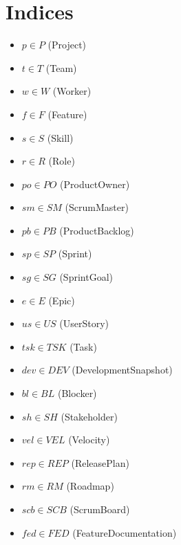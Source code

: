 \documentclass{article}
\begin{document}
\section{Indices}
\begin{itemize}
    \item $p \in P$ (Project)
    \item $t \in T$ (Team)
    \item $w \in W$ (Worker)
    \item $f \in F$ (Feature)
    \item $s \in S$ (Skill)
    \item $r \in R$ (Role)
    \item $po \in PO$ (ProductOwner)
    \item $sm \in SM$ (ScrumMaster)
    \item $pb \in PB$ (ProductBacklog)
    \item $sp \in SP$ (Sprint)
    \item $sg \in SG$ (SprintGoal)
    \item $e \in E$ (Epic)
    \item $us \in US$ (UserStory)
    \item $tsk \in TSK$ (Task)
    \item $dev \in DEV$ (DevelopmentSnapshot)
    \item $bl \in BL$ (Blocker)
    \item $sh \in SH$ (Stakeholder)
    \item $vel \in VEL$ (Velocity)
    \item $rep \in REP$ (ReleasePlan)
    \item $rm \in RM$ (Roadmap)
    \item $scb \in SCB$ (ScrumBoard)
    \item $fed \in FED$ (FeatureDocumentation)
\end{itemize}
\end{document}
